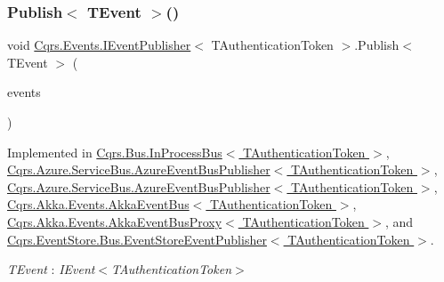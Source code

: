 \subsubsection{\texorpdfstring{Publish$<$ T\+Event $>$()}{Publish< TEvent >()}\hspace{0.1cm}{\footnotesize\ttfamily [2/2]}}
{\footnotesize\ttfamily void \hyperlink{interfaceCqrs_1_1Events_1_1IEventPublisher}{Cqrs.\+Events.\+I\+Event\+Publisher}$<$ T\+Authentication\+Token $>$.Publish$<$ T\+Event $>$ (\begin{DoxyParamCaption}\item[{I\+Enumerable$<$ T\+Event $>$}]{events }\end{DoxyParamCaption})}



Implemented in \hyperlink{classCqrs_1_1Bus_1_1InProcessBus_ae154f274db2a028a6094677d83cc1c74_ae154f274db2a028a6094677d83cc1c74}{Cqrs.\+Bus.\+In\+Process\+Bus$<$ T\+Authentication\+Token $>$}, \hyperlink{classCqrs_1_1Azure_1_1ServiceBus_1_1AzureEventBusPublisher_a8bb9cd1172e7dec117cde75eb6b0f056_a8bb9cd1172e7dec117cde75eb6b0f056}{Cqrs.\+Azure.\+Service\+Bus.\+Azure\+Event\+Bus\+Publisher$<$ T\+Authentication\+Token $>$}, \hyperlink{classCqrs_1_1Azure_1_1ServiceBus_1_1AzureEventBusPublisher_a8bb9cd1172e7dec117cde75eb6b0f056_a8bb9cd1172e7dec117cde75eb6b0f056}{Cqrs.\+Azure.\+Service\+Bus.\+Azure\+Event\+Bus\+Publisher$<$ T\+Authentication\+Token $>$}, \hyperlink{classCqrs_1_1Akka_1_1Events_1_1AkkaEventBus_ad5b996dd77efbf51a2b5a32f94417772_ad5b996dd77efbf51a2b5a32f94417772}{Cqrs.\+Akka.\+Events.\+Akka\+Event\+Bus$<$ T\+Authentication\+Token $>$}, \hyperlink{classCqrs_1_1Akka_1_1Events_1_1AkkaEventBusProxy_af4c202eaab00ed2fb6160d5b114d935c_af4c202eaab00ed2fb6160d5b114d935c}{Cqrs.\+Akka.\+Events.\+Akka\+Event\+Bus\+Proxy$<$ T\+Authentication\+Token $>$}, and \hyperlink{classCqrs_1_1EventStore_1_1Bus_1_1EventStoreEventPublisher_a85b4922ff01b088b01b39463681c6eb6_a85b4922ff01b088b01b39463681c6eb6}{Cqrs.\+Event\+Store.\+Bus.\+Event\+Store\+Event\+Publisher$<$ T\+Authentication\+Token $>$}.

\begin{Desc}
\item[Type Constraints]\begin{description}
\item[{\em T\+Event} : {\em I\+Event$<$T\+Authentication\+Token$>$}]\end{description}
\end{Desc}
